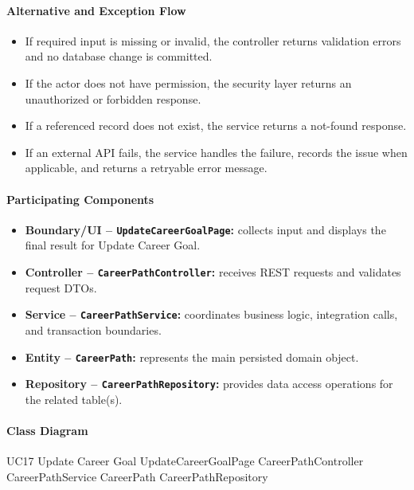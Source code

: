 \paragraph{Alternative and Exception Flow}

\begin{itemize}
    \item If required input is missing or invalid, the controller returns validation errors and no database change is committed.
    \item If the actor does not have permission, the security layer returns an unauthorized or forbidden response.
    \item If a referenced record does not exist, the service returns a not-found response.
    \item If an external API fails, the service handles the failure, records the issue when applicable, and returns a retryable error message.
\end{itemize}

\paragraph{Participating Components}

\begin{itemize}
    \item \textbf{Boundary/UI -- \texttt{UpdateCareerGoalPage}:} collects input and displays the final result for Update Career Goal.
    \item \textbf{Controller -- \texttt{CareerPathController}:} receives REST requests and validates request DTOs.
    \item \textbf{Service -- \texttt{CareerPathService}:} coordinates business logic, integration calls, and transaction boundaries.
    \item \textbf{Entity -- \texttt{CareerPath}:} represents the main persisted domain object.
    \item \textbf{Repository -- \texttt{CareerPathRepository}:} provides data access operations for the related table(s).
\end{itemize}

\paragraph{Class Diagram}

\ClassDiagram
{UC17 Update Career Goal}
{UpdateCareerGoalPage}
{CareerPathController}
{CareerPathService}
{CareerPath}
{CareerPathRepository}

